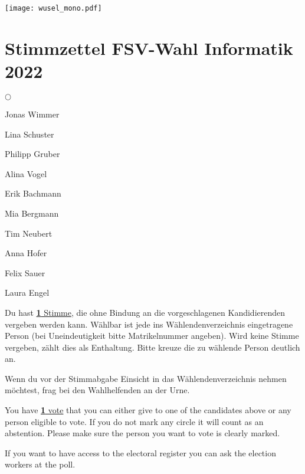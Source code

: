\documentclass[a4paper,9pt]{scrartcl}
\begin{document}
\huge
\hfill
\texttt{[image: wusel\_mono.pdf]}
\vspace{-1em}
\section*{Stimmzettel FSV-Wahl Informatik 2022}


\begin{list}{$\bigcirc$}{}
\item Jonas Wimmer
\item Lina Schuster
\item Philipp Gruber
\item Alina Vogel
\item Erik Bachmann
\item Mia Bergmann
\item Tim Neubert
\item Anna Hofer
\item Felix Sauer
\item Laura Engel

\vspace{0,3cm}
\item \hrulefill \hspace{3cm}

\end{list}
\vspace{2em}
\large
Du hast \underline{\textbf{1} Stimme}, die ohne Bindung an die vorgeschlagenen Kandidierenden vergeben werden kann.
Wählbar ist jede ins Wählendenverzeichnis eingetragene Person (bei Uneindeutigkeit bitte Matrikelnummer angeben).
Wird keine Stimme vergeben, zählt dies als Enthaltung.
Bitte kreuze die zu wählende Person deutlich an.

Wenn du vor der Stimmabgabe Einsicht in das Wählendenverzeichnis nehmen möchtest, frag bei den Wahlhelfenden an der Urne.

\vspace{1em}
You have \underline{\textbf{1} vote} that you can either give to one of the candidates above or any person eligible to vote.
If you do not mark any circle it will count as an abstention.
Please make sure the person you want to vote is clearly marked.

If you want to have access to the electoral register you can ask the election workers at the poll.
\end{document}
